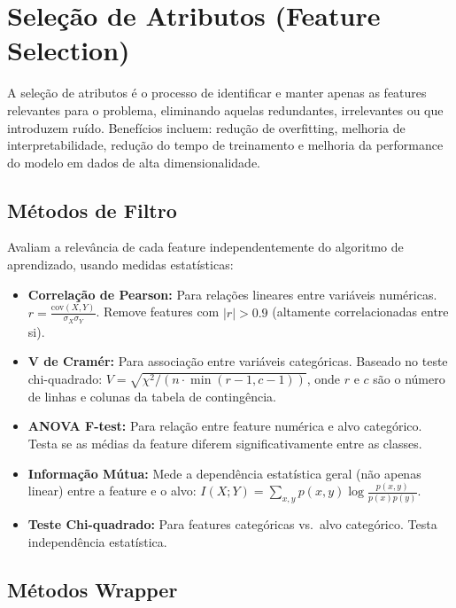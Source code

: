 \documentclass[12pt,a4paper]{article}
\begin{document}
\section{Seleção de Atributos (Feature Selection)}

A seleção de atributos é o processo de identificar e manter apenas as features relevantes para o problema, eliminando aquelas redundantes, irrelevantes ou que introduzem ruído. Benefícios incluem: redução de overfitting, melhoria de interpretabilidade, redução do tempo de treinamento e melhoria da performance do modelo em dados de alta dimensionalidade.

\subsection{Métodos de Filtro}

Avaliam a relevância de cada feature independentemente do algoritmo de aprendizado, usando medidas estatísticas:

\begin{itemize}[leftmargin=*]
  \item \textbf{Correlação de Pearson:} Para relações lineares entre variáveis numéricas. $r = \frac{\text{cov}(X, Y)}{\sigma_X \sigma_Y}$. Remove features com $|r| > 0.9$ (altamente correlacionadas entre si).

  \item \textbf{V de Cramér:} Para associação entre variáveis categóricas. Baseado no teste chi-quadrado: $V = \sqrt{\chi^2 / (n \cdot \min(r-1, c-1))}$, onde $r$ e $c$ são o número de linhas e colunas da tabela de contingência.

  \item \textbf{ANOVA F-test:} Para relação entre feature numérica e alvo categórico. Testa se as médias da feature diferem significativamente entre as classes.

  \item \textbf{Informação Mútua:} Mede a dependência estatística geral (não apenas linear) entre a feature e o alvo: $I(X;Y) = \sum_{x,y} p(x,y) \log \frac{p(x,y)}{p(x)p(y)}$.

  \item \textbf{Teste Chi-quadrado:} Para features categóricas vs.\ alvo categórico. Testa independência estatística.
\end{itemize}

\subsection{Métodos Wrapper}
\end{document}
